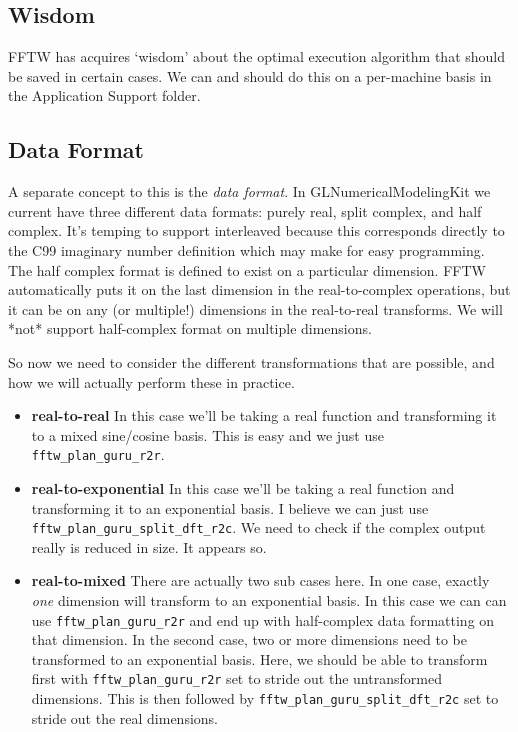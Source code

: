\documentclass[11pt]{article}
\begin{document}
\subsection{Wisdom}

FFTW has acquires `wisdom' about the optimal execution algorithm that should be saved in certain cases. We can and should do this on a per-machine basis in the Application Support folder.



\subsection{Data Format}

A separate concept to this is the \emph{data format}. In GLNumericalModelingKit we current have three different data formats: purely real, split complex, and half complex. It's temping to support interleaved because this corresponds directly to the C99 imaginary number definition which may make for easy programming. The half complex format is defined to exist on a particular dimension. FFTW automatically puts it on the last dimension in the real-to-complex operations, but it can be on any (or multiple!) dimensions in the real-to-real transforms. We will *not* support half-complex format on multiple dimensions.

So now we need to consider the different  transformations that are possible, and how we will actually perform these in practice.
\begin{itemize}
\item \textbf{real-to-real} In this case we'll be taking a real function and transforming it to a mixed sine/cosine basis. This is easy and we just use \verb"fftw_plan_guru_r2r".
\item \textbf{real-to-exponential} In this case we'll be taking a real function and transforming it to an exponential basis. I believe we can just use \verb"fftw_plan_guru_split_dft_r2c". We need to check if the complex output really is reduced in size. It appears so.
\item \textbf{real-to-mixed} There are actually two sub cases here. In one case, exactly \emph{one} dimension will transform to an exponential basis. In this case we can can use \verb"fftw_plan_guru_r2r" and end up with half-complex data formatting on that dimension. In the second case, two or more dimensions need to be transformed to an exponential basis. Here, we should be able to transform first with \verb"fftw_plan_guru_r2r" set to stride out the untransformed dimensions. This is then followed by \verb"fftw_plan_guru_split_dft_r2c" set to stride out the real dimensions.
\end{itemize}
\end{document}
